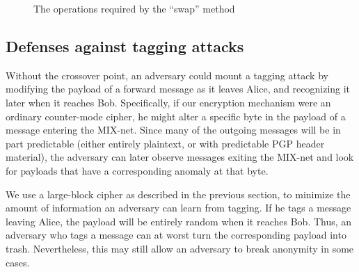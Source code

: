 \documentclass{llncs}
\begin{document}

%


\begin{figure}
\begin{center}
\caption{The operations required by the ``swap'' method} 
\end{center}
\end{figure}


\subsection{Defenses against tagging attacks}
\label{subsec:tagging}

Without the crossover point, an adversary could mount a tagging
attack by modifying the payload of a forward message as
it leaves Alice, and recognizing it later when it reaches Bob.
Specifically, if our encryption mechanism were an ordinary
counter-mode cipher, he might alter a specific byte in the payload of
a message entering the MIX-net. Since many of the outgoing messages
will be in part predictable (either entirely plaintext, or with
predictable PGP header material), the adversary can later observe
messages exiting the MIX-net and look for payloads that have a
corresponding anomaly at that byte.


We use a large-block cipher as described in the previous section, to
minimize the amount of information an adversary can learn from tagging.
If he tags a message
leaving Alice, the payload will be entirely random when it reaches
Bob.  Thus, an adversary who tags a message can at worst turn the
corresponding payload into trash.  
Nevertheless, this may still allow an adversary to
break anonymity in some cases.
\end{document}
